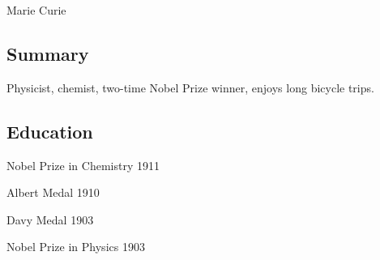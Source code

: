 \documentclass{article}
\begin{document}
{\huge\centering Marie Curie\\[-0.7\baselineskip]\hrulefill\par}

\subsection*{Summary}
Physicist, chemist, two-time Nobel Prize winner, enjoys long bicycle trips.

\subsection*{Education}

\noindent Nobel Prize in Chemistry \hfill 1911

\noindent Albert Medal \hfill 1910

\noindent Davy Medal \hfill 1903

\noindent Nobel Prize in Physics \hfill 1903
\end{document}
